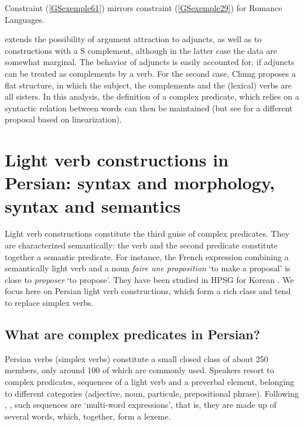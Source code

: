 \documentclass[output=paper]{langsci/langscibook}
\begin{document}
{Constraint (\ref{GSexemple61}) mirrors constraint (\ref{GSexemple29}) for Romance Languages.

\begin{exe} 
\end{exe}

\cite{CC1998} extends the possibility of argument attraction to adjuncts, as well as to constructions with a S complement, although in the latter case the data are somewhat marginal. The behavior of adjuncts is easily accounted for, if adjuncts can be treated as complements \citep{bouma2001satisfying} by a verb. For the second case, Chung proposes a flat structure, in which the subject, the complements and the (lexical) verbs are all sisters. In this analysis, the definition of a complex predicate, which relies on a syntactic relation between words can then be maintained (but see \citealt{lee2001argument} for a different proposal based on linearization).

\section{Light verb constructions in Persian: syntax and morphology, syntax and semantics}\label{GSsection5}

Light verb constructions constitute the third guise of complex predicates. They are characterized semantically: the verb and the second predicate constitute together a semantic predicate. For instance, the French expression combining a semantically light verb and a noun \textit{faire une proposition} `to make a proposal’ is close to \textit{proposer} `to propose’. They have been studied in HPSG for Korean \citep{Ryu:93, lee2001argument, choi2001mixed, Kim2016a-u}. We focus here on Persian light verb constructions, which form a rich class and tend to replace simplex verbs.   
    
\subsection{What are complex predicates in Persian?}\label{GSsection5.1}

Persian verbs (simplex verbs) constitute a small closed class of about 250 members, only around 100 of which are commonly used. Speakers resort to complex predicates, sequences of a light verb and a preverbal element, belonging to different categories (adjective, noun, particule, prepositional phrase). Following \cite{bonami2010persian}, \cite{pollet2012grammaire}, such sequences are `multi-word expressions', that is, they are made up of several words, which, together, form a lexeme. 

}
\end{document}
